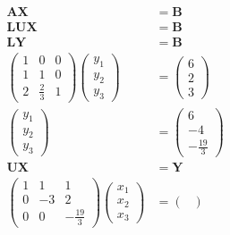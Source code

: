 \documentclass{article}
\begin{document}
\begin{align*}
  \mathbf{A X}                  & = \mathbf{B}     \\
  \mathbf{L U X}                & = \mathbf{B}     \\
  \mathbf{L Y}                  & = \mathbf{B}     \\
  \begin{pmatrix}
    1 & 0           & 0 \\
    1 & 1           & 0 \\
    2 & \frac{2}{3} & 1
  \end{pmatrix} \begin{pmatrix}
                  y_1 \\
                  y_2 \\
                  y_3
                \end{pmatrix} & = \begin{pmatrix}
                                    6 \\
                                    2 \\
                                    3
                                  \end{pmatrix}   \\
  \begin{pmatrix}
    y_1 \\
    y_2 \\
    y_3
  \end{pmatrix}               & = \begin{pmatrix}
                                    6  \\
                                    -4 \\
                                    -\frac{19}{3}
                                  \end{pmatrix}   \\
  \mathbf{U X}                  & = \mathbf{Y}     \\
  \begin{pmatrix}
    1 & 1  & 1             \\
    0 & -3 & 2             \\
    0 & 0  & -\frac{19}{3}
  \end{pmatrix} \begin{pmatrix}
                  x_1 \\
                  x_2 \\
                  x_3
                \end{pmatrix} & = \begin{pmatrix}

\end{pmatrix}
\end{align*}
\end{document}
